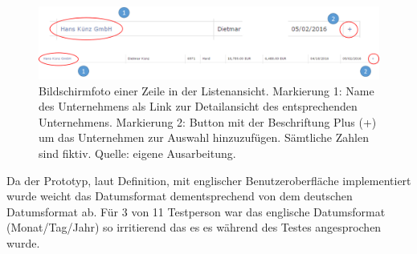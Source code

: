 \documentclass[Bachelorarbeit.tex]{subfiles}
\begin{document}
\begin{figure}[H]
	\centering
	\includegraphics[width=1\linewidth]{img/Evaluation/Userfeedback/AddButton}
	\caption[Auschnitt Listenansicht]{Bildschirmfoto einer Zeile in der Listenansicht. Markierung 1: Name des Unternehmens als Link zur Detailansicht des entsprechenden Unternehmens. Markierung 2: Button mit der Beschriftung Plus (+) um das Unternehmen zur Auswahl hinzuzufügen. Sämtliche Zahlen sind fiktiv. Quelle: eigene Ausarbeitung.}
	\label{fig:AddButton}
\end{figure}
Da der Prototyp, laut Definition, mit englischer Benutzeroberfläche implementiert wurde weicht das Datumsformat dementsprechend von dem deutschen Datumsformat ab. 
Für 3 von 11 Testperson war das englische Datumsformat (Monat/Tag/Jahr) so irritierend das es es während des Testes angesprochen wurde.
\end{document}
